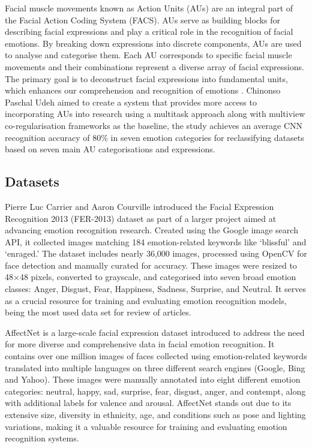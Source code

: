 Facial muscle movements known as Action Units (AUs) are an integral part of the Facial Action Coding System (FACS). AUs serve as building blocks for describing facial expressions and play a critical role in the recognition of facial emotions. By breaking down expressions into discrete components, AUs are used to analyse and categorise them. Each AU corresponds to specific facial muscle movements and their combinations represent a diverse array of facial expressions. The primary goal is to deconstruct facial expressions into fundamental units, which enhances our comprehension and recognition of emotions \cite{Mohammadpour2017-xk}. Chinonso Paschal Udeh \cite{Udeh2022-me} aimed to create a system that provides more access to incorporating AUs into research using a multitask approach along with multiview co-regularisation frameworks as the baseline, the study achieves an average CNN recognition accuracy of 80\% in seven emotion categories for reclassifying datasets based on seven main AU categorisations and expressions.

\subsection{Datasets}
Pierre Luc Carrier and Aaron Courville \cite{Goodfellow2013-al} introduced the Facial Expression Recognition 2013 (FER-2013) dataset as part of a larger project aimed at advancing emotion recognition research. Created using the Google image search API, it collected images matching 184 emotion-related keywords like `blissful' and `enraged.' The dataset includes nearly 36,000 images, processed using OpenCV for face detection and manually curated for accuracy. These images were resized to 48\(\times\)48 pixels, converted to grayscale, and categorised into seven broad emotion classes: Anger, Disgust, Fear, Happiness, Sadness, Surprise, and Neutral.  It serves as a crucial resource for training and evaluating emotion recognition models, being the most used data set for review of articles.

AffectNet \cite{Mollahosseini2017-bj} is a large-scale facial expression dataset introduced to address the need for more diverse and comprehensive data in facial emotion recognition. It contains over one million images of faces collected using emotion-related keywords translated into multiple languages on three different search engines (Google, Bing and Yahoo). These images were manually annotated into eight different emotion categories: neutral, happy, sad, surprise, fear, disgust, anger, and contempt, along with additional labels for valence and arousal. AffectNet stands out due to its extensive size, diversity in ethnicity, age, and conditions such as pose and lighting variations, making it a valuable resource for training and evaluating emotion recognition systems.

